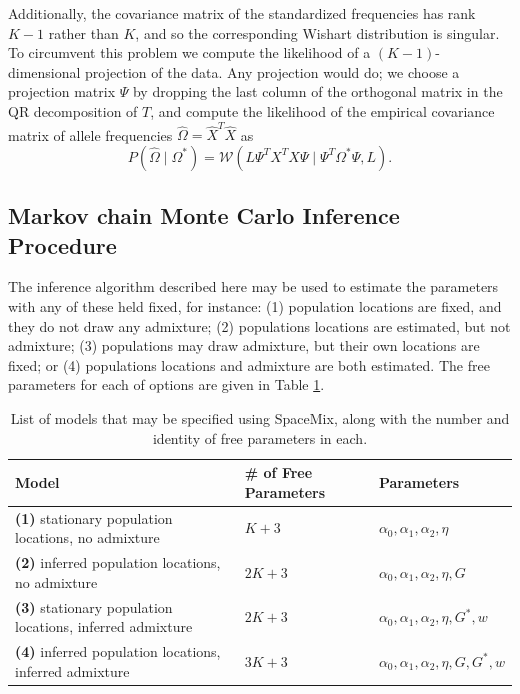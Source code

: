 \documentclass[10pt,letterpaper]{article}
\newcommand{\identifyadmixsource}[1]{{#1^{*}}}
\newcommand{\given}{\mid}
\begin{document}
Additionally, the covariance matrix of the standardized frequencies has rank $K-1$ rather than $K$,
and so the corresponding Wishart distribution is singular.
To circumvent this problem we compute the likelihood of a $(K-1)$-dimensional projection of the data.
Any projection would do; we choose a projection matrix $\Psi$ by dropping the last column of the orthogonal matrix in the QR decomposition of $T$,
and compute the likelihood of the empirical covariance matrix of allele frequencies $\widehat\Omega = \hat X^T \hat X$ as
\begin{equation} \label{eq:projected_wishart_dist}
  P(\widehat{\Omega} \given \Omega^*) = \mathcal{W}\left( L \Psi^T X^T X \Psi \given  \Psi^{T} \Omega^* \Psi, L \right) \text{.}
\end{equation}

\subsection*{Markov chain Monte Carlo Inference Procedure}

The inference algorithm described here may be used to estimate the parameters with any of these held fixed,
for  instance:
(1) population locations are fixed, and they do not draw any admixture; 
(2) populations locations are estimated, but not admixture; 
(3) populations may draw admixture, but their own locations are fixed; or
(4) populations locations and admixture are both estimated.  
The free parameters for each of options are given in Table \ref{tab:model_options}.

\begin{centering}
\begin{table}
\begin{tabular}{| >{\centering\arraybackslash}m{6cm} | >{\centering\arraybackslash}m{3cm} | l |}
	\hline
	\textbf{Model} & \textbf{\# of Free Parameters} & \textbf{Parameters}\\ \hline
	\textbf{(1)} stationary population locations, no admixture & $K + 3$	& $\alpha_0,\alpha_1,\alpha_2,\eta$	\\ \hline
	\textbf{(2)} inferred population locations, \hspace{0.5cm}no admixture & $2K + 3$	& $\alpha_0,\alpha_1,\alpha_2,\eta,G$	\\ \hline
	\textbf{(3)} stationary population locations, inferred admixture & $2K + 3$	& $\alpha_0,\alpha_1,\alpha_2,\eta,\identifyadmixsource{G},w$	\\ \hline
	\textbf{(4)} inferred population locations, inferred admixture & $3K + 3$	&$\alpha_0,\alpha_1,\alpha_2,\eta,G,\identifyadmixsource{G},w$	\\
	\hline
\end{tabular}
\caption{
    List of models that may be specified using SpaceMix, along with the number and identity of free parameters in each.
}\label{tab:model_options}
\end{table}
\end{centering}
\end{document}
